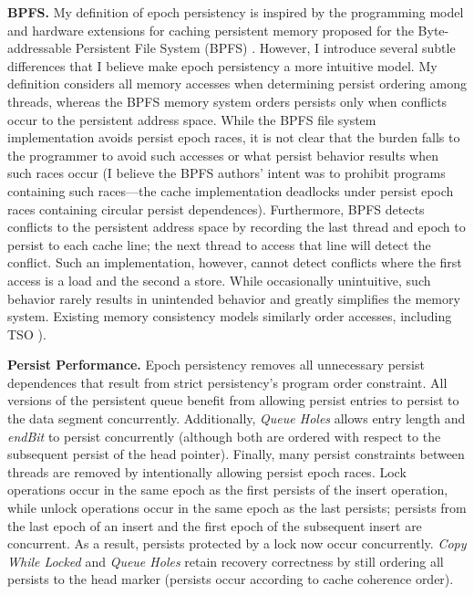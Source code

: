\textbf{BPFS.}
My definition of epoch persistency is inspired by the programming model and hardware extensions for caching persistent memory proposed for the Byte-addressable Persistent File System (BPFS) \cite{ConditNightingale09}.
However, I introduce several subtle differences that I believe make epoch persistency a more intuitive model.
My definition considers all memory accesses when determining persist ordering among threads, whereas the BPFS memory system orders persists only when conflicts occur to the persistent address space.
While the BPFS file system implementation avoids persist epoch races, it is not clear that the burden falls to the programmer to avoid such accesses or what persist behavior results when such races occur (I believe the BPFS authors' intent was to prohibit programs containing such races---the cache implementation deadlocks under persist epoch races containing circular persist dependences).  
Furthermore, BPFS detects conflicts to the persistent address space by recording the last thread and epoch to persist to each cache line; the next thread to access that line will detect the conflict.
Such an implementation, however, cannot detect conflicts where the first access is a load and the second a store.
While occasionally unintuitive, such behavior rarely results in unintended behavior and greatly simplifies the memory system.
Existing memory consistency models similarly order accesses, including TSO \cite{SPARCv9}).

\textbf{Persist Performance.}
Epoch persistency removes all unnecessary persist dependences that result from strict persistency's program order constraint.
All versions of the persistent queue benefit from allowing persist entries to persist to the data segment concurrently.
Additionally, \emph{Queue Holes} allows entry length and \emph{endBit} to persist concurrently (although both are ordered with respect to the subsequent persist of the head pointer).
Finally, many persist constraints between threads are removed by intentionally allowing persist epoch races.
Lock operations occur in the same epoch as the first persists of the insert operation, while unlock operations occur in the same epoch as the last persists; persists from the last epoch of an insert and the first epoch of the subsequent insert are concurrent.
As a result, persists protected by a lock now occur concurrently.
\emph{Copy While Locked} and \emph{Queue Holes} retain recovery correctness by still ordering all persists to the head marker (persists occur according to cache coherence order).

